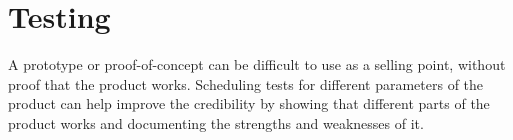 \chapter{Testing}\label{Testing}
A prototype or proof-of-concept can be difficult to use as a selling point, without proof that the product works. Scheduling tests for different parameters of the product can help improve the credibility by showing that different parts of the product works and documenting the strengths and weaknesses of it.










